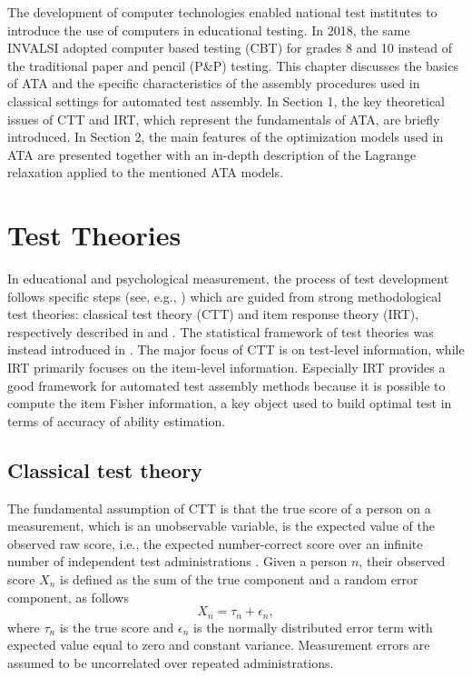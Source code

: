 The development of computer technologies enabled national test institutes to introduce the use of computers in educational testing.
In 2018, the same INVALSI adopted computer based testing (CBT) for grades 8 and 10 instead of the traditional paper and pencil (P\&P) testing.
This chapter discusses the basics of ATA and the specific characteristics of the assembly procedures used in classical settings for automated test assembly.
In Section 1, the key theoretical issues of CTT and IRT, which represent the fundamentals of ATA, are briefly introduced.
In Section 2, the main features of the optimization models used in ATA are presented together with an in-depth description of the Lagrange relaxation \parencite{fisher1981lagrangian} applied to the mentioned ATA models.

\section{Test Theories}
\label{sec:TestTheories}

In educational and psychological measurement, the process of test development follows specific steps (see, e.g., \textcite{downing2006twelve}) which are guided from strong methodological test theories: classical test theory (CTT) and item response theory (IRT), respectively described in \textcite{lord1952theory} and \textcite{Hamb85,Hamb91}.
The statistical framework of test theories was instead introduced in \textcite{lord1968statistical}.
The major focus of CTT is on test-level information, while IRT primarily focuses on the item-level information.
Especially IRT provides a good framework for automated test assembly methods because it is possible to compute the item Fisher information, a key object used to build optimal test in terms of accuracy of ability estimation.

\subsection{Classical test theory}\label{sec:ctt}

The fundamental assumption of CTT is that the true score of a person on a measurement, which is an unobservable variable, is the expected value of the observed raw score, i.e., the expected number-correct score over an infinite number of independent test administrations \parencite{novick1966axioms,lord1968statistical}.
Given a person $n$, their observed score $X_n$ is defined as the sum of the true component and a random error component, as follows
\begin{equation}
X_n = \tau_n+\epsilon_n,
\end{equation}
where $\tau_n$ is the true score and $\epsilon_n$ is the normally distributed error term with expected value equal to zero and constant variance.
Measurement errors are assumed to be uncorrelated over repeated administrations.

